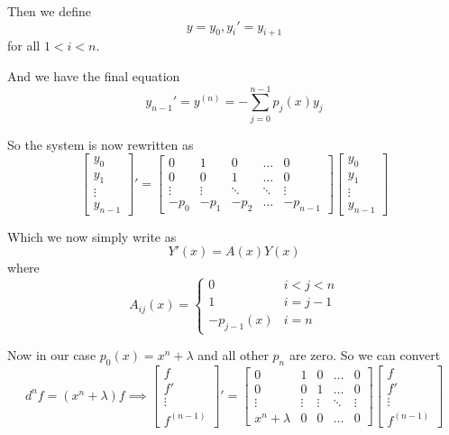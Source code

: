 \documentclass{amsart}
\theoremstyle{definition}
\theoremstyle{remark}
\numberwithin{equation}{section}
\begin{document}
Then we define
\[
y = y_0, y_{i}' = y_{i+1}
\]
for all $1<i<n$.  

And we have the final equation
\[
y_{n-1}' = y^{(n)} = - \sum_{j=0}^{n-1}p_j(x) y_j
\]


So the system is now rewritten as
\begin{equation}
\begin{bmatrix}
y_0 \\ y_1 \\ \vdots \\ y_{n-1}
\end{bmatrix}' = \begin{bmatrix}
0 & 1 & 0 & \dots & 0\\
0 & 0 & 1 & \dots & 0\\
\vdots & \vdots & \ddots & \ddots& \vdots\\
-p_{0} & -p_1 & -p_{2} & \dots & -p_{n-1}
\end{bmatrix}
\begin{bmatrix}
y_0 \\ y_1 \\ \vdots \\ y_{n-1}
\end{bmatrix}
\end{equation}

Which we now simply write as
\begin{equation}
Y'(x) = A(x) Y(x)
\end{equation}
where
\[
A_{ij}(x) = \left\{\begin{array}{cc}
0 & {i<j<n}\\
1 & {i = j-1}\\
-p_{j-1}(x) & {i=n}
\end{array}
\right.
\]



Now in our case $p_0(x) = x^n + \lambda$ and all other $p_n$ are zero.  So we can convert
\begin{equation}
d^n f = (x^n+\lambda)f \implies \begin{bmatrix}
f \\ f' \\ \vdots \\ f^{(n-1)}
\end{bmatrix}' = 
\begin{bmatrix}
0 & 1 & 0 & \dots  & 0\\
0 & 0 & 1 & \dots & 0\\
\vdots & \vdots & \vdots & \ddots & \vdots\\
x^n+\lambda & 0 & 0 & \dots & 0 
\end{bmatrix}
\begin{bmatrix}
f \\ f' \\ \vdots \\ f^{(n-1)}
\end{bmatrix}
\end{equation}
\end{document}
